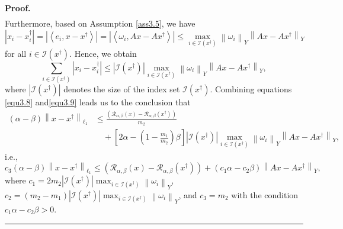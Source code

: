 \documentclass[a4paper,12pt]{article}
\numberwithin{equation}{section}
\newenvironment{proof}[1][Proof]{\textbf{#1.} }
{\ \rule{0.75em}{0.75em}\smallskip}
\begin{document}
\begin{proof}
\begin{align}
    \end{align}
    Furthermore, based on Assumption \ref{ass3.5}, we have
    \begin{equation*}
        \left|x_{i}-x_{i}^{\dagger}\right|=\left|\left<e_{i},x-x^{\dagger}\right>\right| =\left|\left<\omega_{i},Ax-Ax^{\dagger}\right>\right| \leq \max_{i\in\mathcal{I}\left(x^{\dagger}\right)}\left\|\omega_{i}\right\|_{Y}\left\|Ax-Ax^{\dagger}\right\|_{Y}
    \end{equation*}
    for all $i\in\mathcal{I}\left(x^{\dagger}\right)$. Hence, we obtain
    \begin{equation}\label{equ3.9}
        \sum_{i\in\mathcal{I}\left(x^{\dagger}\right)}\left|x_{i}-x_{i}^{\dagger}\right| \leq \left|\mathcal{I}\left(x^{\dagger}\right)\right| \max_{i\in\mathcal{I}\left(x^{\dagger}\right)}\left\|\omega_{i}\right\|_{Y}\left\|Ax-Ax^{\dagger}\right\|_{Y},
    \end{equation}
    where $\left|\mathcal{I}\left(x^{\dagger}\right)\right|$ denotes the size of the index set $\mathcal{I}\left(x^{\dagger}\right)$. Combining equations \eqref{equ3.8} and\eqref{equ3.9} leads us to the conclusion that
    \begin{align*}
        \left(\alpha-\beta\right)\left\|x-x^{\dagger}\right\|_{\ell_{1}} 
        & \leq \frac{\left(\mathcal{R}_{\alpha,\beta}\left(x\right) -\mathcal{R}_{\alpha,\beta}\left(x^{\dagger}\right)\right)}{m_{2}} \\
        & \quad + \left[2\alpha-\left(1-\frac{m_{1}}{m_{2}}\right)\beta\right]\left|\mathcal{I}\left(x^{\dagger}\right)\right| \max_{i\in\mathcal{I}\left(x^{\dagger}\right)}\left\|\omega_{i}\right\|_{Y}\left\|Ax-Ax^{\dagger}\right\|_{Y},
    \end{align*}
    i.e.,
    \begin{equation*}
        c_{3}\left(\alpha-\beta\right)\left\|x-x^{\dagger}\right\|_{\ell_{1}}\leq \left(\mathcal{R}_{\alpha,\beta}\left(x\right) -\mathcal{R}_{\alpha,\beta}\left(x^{\dagger}\right)\right) + \left(c_{1}\alpha-c_{2}\beta\right)\left\|Ax-Ax^{\dagger}\right\|_{Y},
    \end{equation*}
    where $c_{1}=2m_{2}\left|\mathcal{I}\left(x^{\dagger}\right)\right| \max_{i\in\mathcal{I}\left(x^{\dagger}\right)}\left\|\omega_{i}\right\|_{Y}$, $c_{2}=\left(m_{2}-m_{1}\right)\left|\mathcal{I}\left(x^{\dagger}\right)\right| \max_{i\in\mathcal{I}\left(x^{\dagger}\right)}\left\|\omega_{i}\right\|_{Y}$, and $c_{3}=m_{2}$ with the condition $c_{1}\alpha-c_{2}\beta>0$.
\end{proof}
\end{document}
